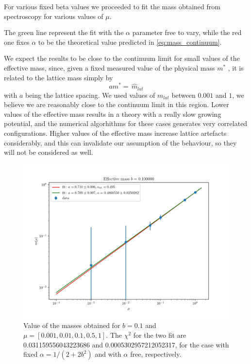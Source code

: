 \documentclass[12pt,a4paper]{report}
\begin{document}
For various fixed beta values we proceeded to fit the mass obtained from spectroscopy for various values of $\mu$.


The green line represent the fit with the $\alpha$ parameter free to vary, while the red one fixes $\alpha$ to be the theoretical value predicted in \eqref{eq:mass_continuum}.

We expect the results to be close to the continuum limit for small values of the effective mass, since, given a fixed measured value of the physical mass $m^*$ , it is related to the lattice mass simply by \begin{equation}
a m^* =  \, \hat m_{lat}
\end{equation} with $a$ being the lattice spacing. We used  values of $m_{lat}$ between $0.001$ and $1$, we believe we are reasonably close to the continuum limit in this region. Lower values of the effective mass results in a theory with a really slow growing potential, and the numerical algorhithms for these cases generates very correlated configurations. Higher values of the effective mass increase lattice artefacts considerably, and this can invalidate our assumption of the behaviour, so they will not be considered as well.
\begin{figure}
\label{fig:mass_scaling_b0.1}
\centering
\includegraphics[width=1.0\textwidth]{b0_1}
\caption{Value of the masses obtained for $b=0.1$ and 
$\mu = [0.001,0.01,0.1,0.5,1]$. The $\chi^2$ for the two fit are 0.031159556043223686 and 0.0005302957212052317, for the case with fixed $\alpha = 1/(2+2b^2)$ and with $\alpha$ free, respectively.}
\end{figure}
\end{document}
